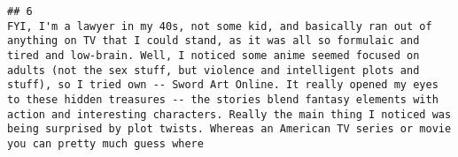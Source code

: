 \documentclass[
]{article}
\begin{document}
\begin{verbatim}
## 6                                                                                                                                                                                                                                                                                                                                                                                                                                                                                                                                                                                                                                                                                                                                                                                                                                                                                                                                                                                                                                                                                                                                                                                                                                                                                                                                                                                                                                                                                                                                                                                                                                                                                                                                                                                                                                                                                                                                                                                                                                                                                                                                                                                                                                                                                                                                                                                                                                                                                                                                                                                                                                                                                                                                                                                                                                                 FYI, I'm a lawyer in my 40s, not some kid, and basically ran out of anything on TV that I could stand, as it was all so formulaic and tired and low-brain. Well, I noticed some anime seemed focused on adults (not the sex stuff, but violence and intelligent plots and stuff), so I tried own -- Sword Art Online. It really opened my eyes to these hidden treasures -- the stories blend fantasy elements with action and interesting characters. Really the main thing I noticed was being surprised by plot twists. Whereas an American TV series or movie you can pretty much guess where 
\end{verbatim}
\end{document}
